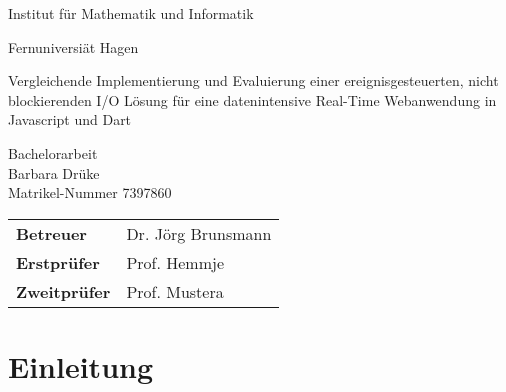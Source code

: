 
\pagestyle{empty}

\clearscrheadings\clearscrplain

\begin{center}
\begin{Huge}
Institut für Mathematik und Informatik\\
\vspace{3mm}
\end{Huge}{\Large Fernuniversiät Hagen}\\

\vspace{20mm}
\begin{Large}
Vergleichende Implementierung und Evaluierung einer ereignisgesteuerten, nicht
blockierenden I/O Lösung für eine datenintensive Real-Time Webanwendung in Javascript
und Dart\\
\end{Large}
\vspace{8mm}
Bachelorarbeit\\
\vspace{0.4cm}
\vspace{2 cm}
Barbara Drüke \\
Matrikel-Nummer 7397860\\
\vspace{5cm}
\begin{tabular}{ll}
{\bf Betreuer} & Dr. Jörg Brunsmann\\
{\bf Erstprüfer}&Prof. Hemmje\\
{\bf Zweitprüfer}&Prof. Mustera\\
\end{tabular}

\end{center}
\clearpage


\pagestyle{useheadings} %

\tableofcontents
\listoffigures
\listoftables







\chapter{Einleitung}
